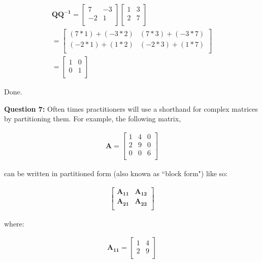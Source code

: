\documentclass[12pt]{article}
\begin{document}
\begin{eqnarray*}\mathbf{Q}\mathbf{Q^{-1}}=
\begin{bmatrix} 
7 & -3\\
-2 & 1 \\
\end{bmatrix}
\begin{bmatrix}
1 & 3\\
2 & 7\\
\end{bmatrix}\\=
\begin{bmatrix}
(7*1) + (-3*2) & (7*3)+(-3*7)\\
(-2*1) + (1*2) & (-2*3)+(1*7)\\
\end{bmatrix}\\=
\begin{bmatrix}
1& 0\\
0 & 1\\
\end{bmatrix}
\end{eqnarray*}

Done.




\bigskip
\textbf{Question 7:} Often times practitioners will use a shorthand for complex matrices by partitioning them. For example, the following matrix,




\begin{eqnarray*}
 \mathbf{A}=
\begin{bmatrix} 
1&4&0  \\
2&9&0\\
0&0&6\\
\end{bmatrix}
\end{eqnarray*}

can be written in partitioned form (also known as ``block form") like so:

\begin{eqnarray*}
\begin{bmatrix} 
\mathbf{A_{11}} & \mathbf{A_{12}}  \\
\mathbf{A_{21}} & \mathbf{A_{22}}  \\
\end{bmatrix}
\end{eqnarray*}

where:

\begin{eqnarray*}
\mathbf{A_{11}}=
\begin{bmatrix} 
1& 4 \\
2 & 9 \\
\end{bmatrix}
\end{eqnarray*}
\end{document}
